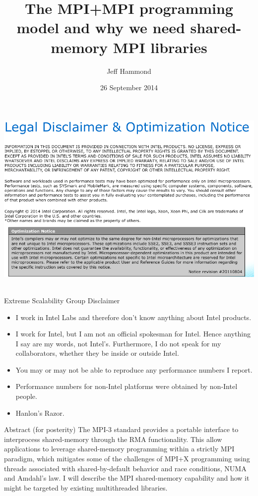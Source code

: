 \documentclass[11pt]{beamer}
\title[MPI+MPI]{The MPI+MPI programming model and why we need shared-memory MPI libraries}
\author[Jeff Hammond]{Jeff Hammond}
\institute[Intel Labs]{Extreme Scalability Group \& Parallel Computing Lab\\ Intel Corporation (Portland, OR)}
\date[]{26 September 2014}
\begin{document}
\frame{\titlepage}

\begin{frame}{}
\includegraphics[scale=0.33,angle=0]{intel-legal} \
\end{frame}

\begin{frame}{Extreme Scalability Group Disclaimer}
    \begin{itemize}
        \item I work in Intel Labs and therefore don't know anything about Intel products.
        \item I work for Intel, but I am not an official spokesman for Intel.
              Hence anything I say are my words, not Intel's.
              Furthermore, I do not speak for my collaborators,
              whether they be inside or outside Intel.
        \item You may or may not be able to reproduce any performance numbers I report.
        \item Performance numbers for non-Intel platforms were obtained by non-Intel people.
        \item Hanlon's Razor.
    \end{itemize}
\end{frame}

\begin{frame}{Abstract (for posterity)} \Large
    The MPI-3 standard provides a portable interface to interprocess 
    shared-memory through the RMA functionality. This allow applications 
    to leverage shared-memory programming within a strictly MPI paradigm, 
    which mitigates some of the challenges of MPI+X programming using 
    threads associated with shared-by-default behavior and race conditions, 
    NUMA and Amdahl's law. I will describe the MPI shared-memory capability 
    and how it might be targeted by existing multithreaded libraries.
\end{frame}
\end{document}
